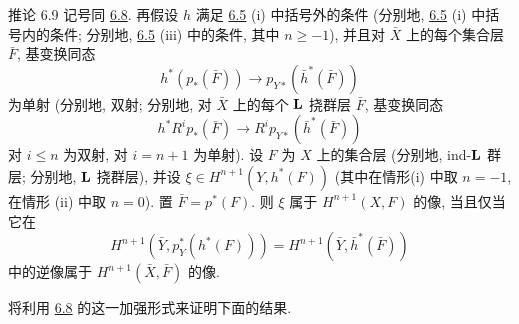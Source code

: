 \begin{enonce*}{推论 6.9}
记号同 \hyperref[XII.prop6.8]{6.8}. 再假设 $h$ 满足 \hyperref[XII.prop6.5]{6.5} \textup{(i)} 中括号外的条件 (分别地, \hyperref[XII.prop6.5]{6.5} \textup{(i)} 中括号内的条件; 分别地, \hyperref[XII.prop6.5]{6.5} \textup{(iii)} 中的条件, 其中 $n\geq -1$), 并且对 $\bar{X}$ 上的每个集合层 $\bar{F}$, 基变换同态
$$
h^{\ast}(p_{\ast}(\bar{F}))\longrightarrow
p_{Y\ast}(\bar{h}^{\ast}(\bar{F}))
$$
为单射 (分别地, 双射; 分别地, 对 $\bar{X}$ 上的每个 $\mathbf{L}$ 挠群层 $\bar{F}$, 基变换同态
$$
h^{\ast}R^{i}p_{\ast}(\bar{F})\longrightarrow
R^{i}p_{Y\ast}(\bar{h}^{\ast}(\bar{F}))
$$
对 $i\leq n$ 为双射, 对 $i=n+1$ 为单射). 设 $F$ 为 $X$ 上的集合层 (分别地, ind-$\mathbf{L}$ 群层; 分别地, $\mathbf{L}$ 挠群层), 并设 $\xi\in H^{n+1}(Y,h^{\ast}(F))$ (其中在情形\pageoriginale \textup{(i)} 中取 $n=-1$, 在情形 \textup{(ii)} 中取 $n=0$). 置 $\bar{F}=p^{\ast}(F)$. 则 $\xi$ 属于 $H^{n+1}(X,F)$ 的像, 当且仅当它在
$$
H^{n+1}(\bar{Y},p_Y^{\ast}(h^{\ast}(F)))
=H^{n+1}(\bar{Y},\bar{h}^{\ast}(\bar{F}))
$$
中的逆像属于 $H^{n+1}(\bar{X},\bar{F})$ 的像.
\end{enonce*}

将利用 \hyperref[XII.prop6.8]{6.8} 的这一加强形式来证明下面的结果.

